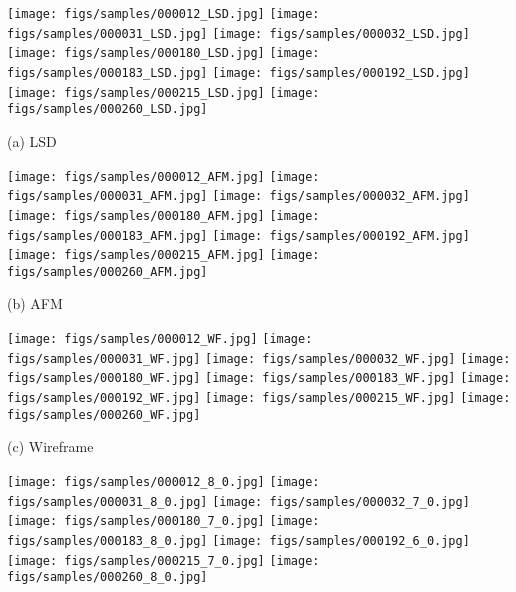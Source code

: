 \documentclass[10pt,twocolumn,letterpaper]{article}
\begin{document}
\begin{figure*}
    \centering\hfill
    \begin{minipage}[t]{0.19\linewidth}\centering
    \texttt{[image: figs/samples/000012\_LSD.jpg]}
    \texttt{[image: figs/samples/000031\_LSD.jpg]}
    \texttt{[image: figs/samples/000032\_LSD.jpg]}
    \texttt{[image: figs/samples/000180\_LSD.jpg]}
    \texttt{[image: figs/samples/000183\_LSD.jpg]}
    \texttt{[image: figs/samples/000192\_LSD.jpg]}
    \texttt{[image: figs/samples/000215\_LSD.jpg]}
    \texttt{[image: figs/samples/000260\_LSD.jpg]}
    
    (a) LSD
    \end{minipage}\hfill
    \begin{minipage}[t]{0.19\linewidth}\centering
    \texttt{[image: figs/samples/000012\_AFM.jpg]}
    \texttt{[image: figs/samples/000031\_AFM.jpg]}
    \texttt{[image: figs/samples/000032\_AFM.jpg]}
    \texttt{[image: figs/samples/000180\_AFM.jpg]}
    \texttt{[image: figs/samples/000183\_AFM.jpg]}
    \texttt{[image: figs/samples/000192\_AFM.jpg]}
    \texttt{[image: figs/samples/000215\_AFM.jpg]}
    \texttt{[image: figs/samples/000260\_AFM.jpg]}

    
    (b) AFM
    \end{minipage}\hfill
    \begin{minipage}[t]{0.19\linewidth}\centering
    \texttt{[image: figs/samples/000012\_WF.jpg]}
    \texttt{[image: figs/samples/000031\_WF.jpg]}
    \texttt{[image: figs/samples/000032\_WF.jpg]}
    \texttt{[image: figs/samples/000180\_WF.jpg]}
    \texttt{[image: figs/samples/000183\_WF.jpg]}
    \texttt{[image: figs/samples/000192\_WF.jpg]}
    \texttt{[image: figs/samples/000215\_WF.jpg]}
    \texttt{[image: figs/samples/000260\_WF.jpg]}
    
    (c) Wireframe
    \end{minipage}\hfill
    \begin{minipage}[t]{0.19\linewidth}\centering
    \texttt{[image: figs/samples/000012\_8\_0.jpg]}
    \texttt{[image: figs/samples/000031\_8\_0.jpg]}
    \texttt{[image: figs/samples/000032\_7\_0.jpg]}
    \texttt{[image: figs/samples/000180\_7\_0.jpg]}
    \texttt{[image: figs/samples/000183\_8\_0.jpg]}
    \texttt{[image: figs/samples/000192\_6\_0.jpg]}
    \texttt{[image: figs/samples/000215\_7\_0.jpg]}
    \texttt{[image: figs/samples/000260\_8\_0.jpg]}
    

\end{minipage}
\end{figure*}
\end{document}
